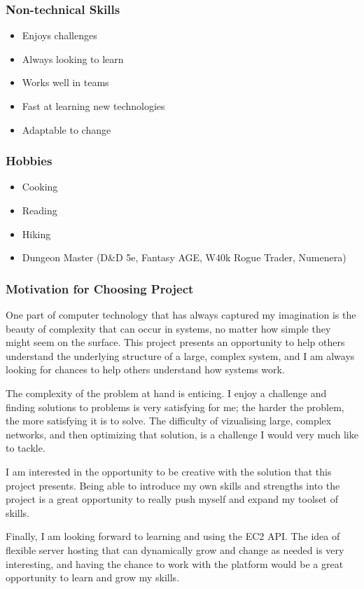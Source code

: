 \documentclass{article}
\begin{document}
		\subsubsection{Non-technical Skills}
			\begin{itemize}
				\item Enjoys challenges
				\item Always looking to learn
				\item Works well in teams
				\item Fast at learning new technologies
				\item Adaptable to change
			\end{itemize}
		\subsubsection{Hobbies}
			\begin{itemize}
				\item Cooking
				\item Reading
				\item Hiking
				\item Dungeon Master (D\&D 5e, Fantasy AGE, W40k Rogue Trader, Numenera)
			\end{itemize}
		\subsubsection{Motivation for Choosing Project}
			One part of computer technology that has always captured my imagination is the beauty of complexity that can occur in systems, no matter how simple they might seem on the surface. This project presents an opportunity to help others understand the underlying structure of a large, complex system, and I am always looking for chances to help others understand how systems work.
			
			The complexity of the problem at hand is enticing. I enjoy a challenge and finding solutions to problems is very satisfying for me; the harder the problem, the more satisfying it is to solve. The difficulty of vizualising large, complex networks, and then optimizing that solution, is a challenge I would very much like to tackle.
			
			I am interested in the opportunity to be creative with the solution that this project presents. Being able to introduce my own skills and strengths into the project is a great opportunity to really push myself and expand my toolset of skills.
			
			Finally, I am looking forward to learning and using the EC2 API. The idea of flexible server hosting that can dynamically grow and change as needed is very interesting, and having the chance to work with the platform would be a great opportunity to learn and grow my skills.
\end{document}
